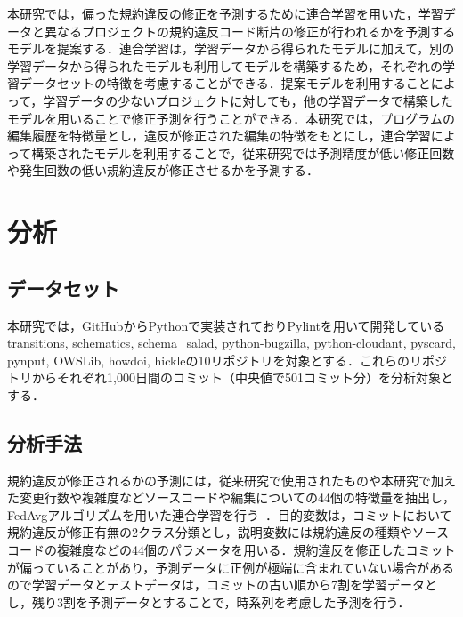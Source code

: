 \documentclass[uplatex,dvipdfmx,a4paper,twocolumn,base=11pt,jbase=11pt,ja=standard]{bxjsarticle}  %
\begin{document}
本研究では，偏った規約違反の修正を予測するために連合学習を用いた，学習データと異なるプロジェクトの規約違反コード断片の修正が行われるかを予測するモデルを提案する．連合学習は，学習データから得られたモデルに加えて，別の学習データから得られたモデルも利用してモデルを構築するため，それぞれの学習データセットの特徴を考慮することができる．提案モデルを利用することによって，学習データの少ないプロジェクトに対しても，他の学習データで構築したモデルを用いることで修正予測を行うことができる．本研究では，プログラムの編集履歴を特徴量とし，違反が修正された編集の特徴をもとにし，連合学習によって構築されたモデルを利用することで，従来研究では予測精度が低い修正回数や発生回数の低い規約違反が修正させるかを予測する．

\section{分析}







\subsection{データセット}
本研究では，GitHubからPythonで実装されておりPylintを用いて開発しているtransitions, schematics, schema\_salad, python-bugzilla, python-cloudant, pyscard, pynput, OWSLib, howdoi, hickleの10リポジトリを対象とする．これらのリポジトリからそれぞれ1,000日間のコミット（中央値で501コミット分）を分析対象とする．

\subsection{分析手法}
規約違反が修正されるかの予測には，従来研究で使用されたものや本研究で加えた変更行数や複雑度などソースコードや編集についての44個の特徴量を抽出し，FedAvgアルゴリズムを用いた連合学習を行う~\cite{article2}．目的変数は，コミットにおいて規約違反が修正有無の2クラス分類とし，説明変数には規約違反の種類やソースコードの複雑度などの44個のパラメータを用いる．規約違反を修正したコミットが偏っていることがあり，予測データに正例が極端に含まれていない場合があるので学習データとテストデータは，コミットの古い順から7割を学習データとし，残り3割を予測データとすることで，時系列を考慮した予測を行う．
\end{document}
